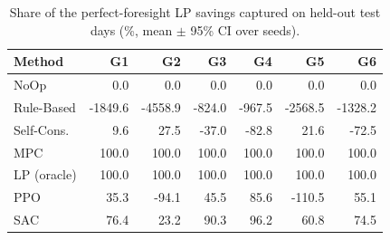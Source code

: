 \begin{table}[t]\centering\small
\caption{Share of the perfect-foresight LP savings captured on held-out test days (\%, mean $\pm$ 95\% CI over seeds).}\label{tab:capture}
\begin{tabular}{lrrrrrr}
\toprule
Method & G1 & G2 & G3 & G4 & G5 & G6 \\
\midrule
NoOp & 0.0 & 0.0 & 0.0 & 0.0 & 0.0 & 0.0 \\
Rule-Based & -1849.6 & -4558.9 & -824.0 & -967.5 & -2568.5 & -1328.2 \\
Self-Cons. & 9.6 & 27.5 & -37.0 & -82.8 & 21.6 & -72.5 \\
MPC & 100.0 & 100.0 & 100.0 & 100.0 & 100.0 & 100.0 \\
LP (oracle) & 100.0 & 100.0 & 100.0 & 100.0 & 100.0 & 100.0 \\
PPO & 35.3 & -94.1 & 45.5 & 85.6 & -110.5 & 55.1 \\
SAC & 76.4 & 23.2 & 90.3 & 96.2 & 60.8 & 74.5 \\
\midrule
\bottomrule
\end{tabular}
\end{table}